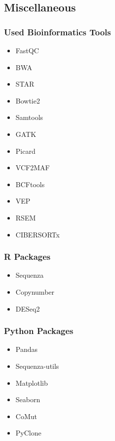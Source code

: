 \documentclass{beamer}
\begin{document}
    \subsection{Miscellaneous}
    \begin{frame}
        \frametitle{Used Bioinformatics Tools}

        \begin{itemize}
            \item FastQC \cite{fastqc1}
            \item BWA \cite{bwa1, bwa2}
            \item STAR \cite{star1}
            \item Bowtie2 \cite{bowtie1}
            \item Samtools \cite{samtools1}
            \item GATK \cite{gatk1, gatk2}
            \item Picard \cite{picard1}
            \item VCF2MAF \cite{vcf2maf1}
            \item BCFtools \cite{bcftools1}
            \item VEP \cite{vep1}
            \item RSEM \cite{RSEM1}
            \item CIBERSORTx \cite{cibersort1}
        \end{itemize}
    \end{frame}

    \begin{frame}
        \frametitle{R Packages}

        \begin{itemize}
            \item Sequenza \cite{sequenza1}
            \item Copynumber \cite{copynumber1, copynumber2}
            \item DESeq2 \cite{DESeq1}
        \end{itemize}
    \end{frame}

    \begin{frame}
        \frametitle{Python Packages}

        \begin{itemize}
            \item Pandas \cite{pandas1, pandas2}
            \item Sequenza-utils \cite{sequenza1}
            \item Matplotlib \cite{matplotlib1}
            \item Seaborn \cite{seaborn1}
            \item CoMut \cite{comut1}
            \item PyClone \cite{pyclone1}
        \end{itemize}
    \end{frame}
\end{document}
